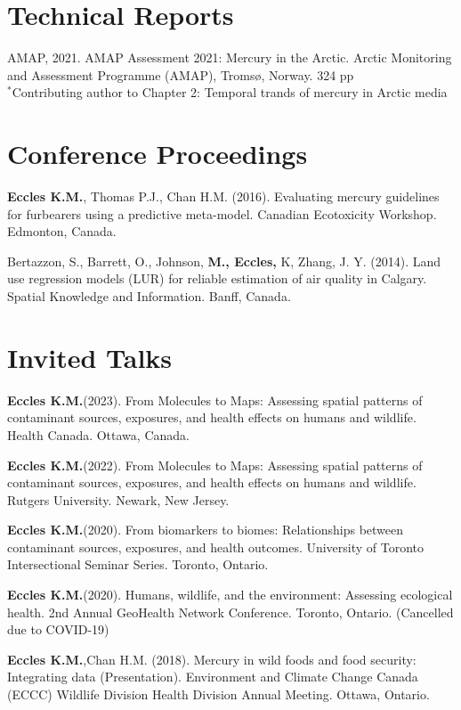\documentclass[margin,line]{res}
\begin{document}
\begin{resume}
\vspace*{.1in}
\section{\sc Technical Reports}
AMAP, 2021. AMAP Assessment 2021: Mercury in the Arctic. Arctic Monitoring and Assessment Programme (AMAP), Tromsø, Norway. 324 pp\\
$^{*}$Contributing author to Chapter 2: Temporal trands of mercury in Arctic media\\

\vspace*{.1in}
\section{\sc Conference Proceedings}
\textbf{Eccles K.M.}, Thomas P.J., Chan H.M. (2016). Evaluating mercury guidelines for furbearers using a predictive meta-model. Canadian Ecotoxicity Workshop. Edmonton, Canada.

Bertazzon, S., Barrett, O., Johnson, \textbf{M., Eccles,} K, Zhang, J. Y. (2014). Land use regression models (LUR) for reliable estimation of air quality in Calgary. Spatial Knowledge and Information. Banff, Canada.\\

\vspace*{.1in}
\section{\sc Invited Talks}

\textbf{Eccles K.M.}(2023). From Molecules to Maps: Assessing spatial patterns of contaminant sources, exposures, and health effects on humans and wildlife. Health Canada. Ottawa, Canada.

\textbf{Eccles K.M.}(2022). From Molecules to Maps: Assessing spatial patterns of contaminant sources, exposures, and health effects on humans and wildlife. Rutgers University. Newark, New Jersey.

\textbf{Eccles K.M.}(2020). From biomarkers to biomes: Relationships between contaminant sources, exposures, and health outcomes. University of Toronto Intersectional Seminar Series. Toronto, Ontario.

\textbf{Eccles K.M.}(2020). Humans, wildlife, and the environment: Assessing ecological health. 2nd Annual GeoHealth Network Conference. Toronto, Ontario. (Cancelled due to COVID-19)

\textbf{Eccles K.M.},Chan H.M. (2018). Mercury in wild foods and food security: Integrating data (Presentation). Environment and Climate Change Canada (ECCC) Wildlife Division Health Division Annual Meeting. Ottawa, Ontario.


\end{resume}
\end{document}
